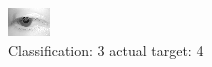 \begin{figure}[h!]
\begin{center}
\includegraphics[width=0.60\columnwidth]{figures/ID2603_class_3_target_4.png}
\end{center}
\caption{ Classification: 3 actual target: 4}
\label{fig:ID2603_class_3_target_4}
\end{figure}
